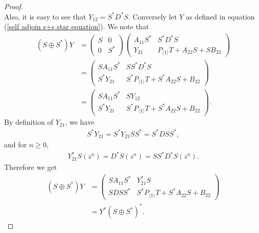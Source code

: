 \documentclass[12pt, reqno]{amsart}
\theoremstyle{definition}
\theoremstyle{remark}
\numberwithin{equation}{section}
\begin{document}
\begin{proof}
\begin{equation*}
            \end{equation*}
            Also, it is easy to see that $Y_{12}=S^*D^*S.$ Conversely let $Y$ as defined in equation (\ref{self adjoin s+s star equation}). We note that
            \begin{align*}
            (S \oplus S^*) Y&=
                \begin{pmatrix}
                    S&0\\
                    0&S^*
                \end{pmatrix}
                \begin{pmatrix}
                    A_{11}S^*& S^*D^*S\\
                    Y_{21}& P_{\langle 1\rangle}T+A_{22}S+SB_{22}
                \end{pmatrix}\\
                &=
                \begin{pmatrix}
                    SA_{11}S^*& SS^*D^*S\\
                    S^*Y_{21}& S^*P_{\langle 1\rangle}T+S^*A_{22}S+B_{22}
                \end{pmatrix}\\
                &= \begin{pmatrix}
                    SA_{11}S^*& SY_{12}\\
                    S^*Y_{21}& S^*P_{\langle 1\rangle}T+S^*A_{22}S+B_{22}
                \end{pmatrix}.
            \end{align*}
            By definition of $Y_{21}$, we have 
            \begin{align*}
                S^*Y_{21}=S^*Y_{21}SS^*=S^*DSS^*,
            \end{align*}
            and for $n \geq 0,$
            \begin{align*}
            Y^*_{21}S(z^n)=D^*S(z^n)=SS^*D^*S(z^n).
            \end{align*}
            Therefore we get
            \begin{align*}
                (S \oplus S^*) Y&=
                \begin{pmatrix}
                    SA_{11}S^*& Y^*_{21}S\\
                    SDSS^*& S^*P_{\langle 1\rangle}T+S^*A_{22}S+B_{22}
                \end{pmatrix}\\
                &=Y^*(S\oplus S^*)^*.
            \end{align*}
\end{proof}
\end{document}
